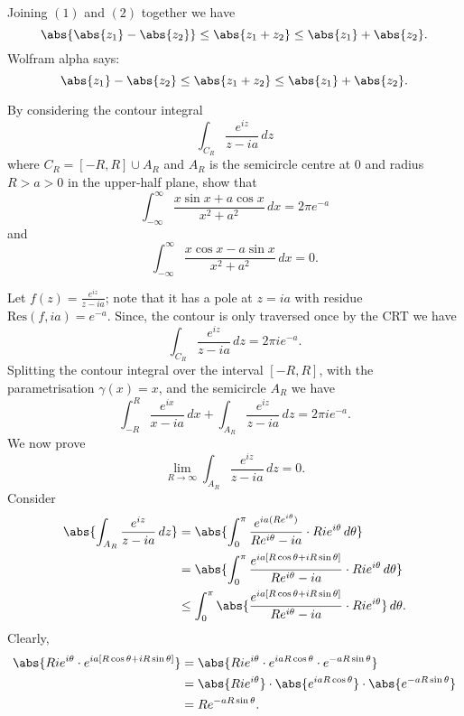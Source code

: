 \documentclass[12pt, a4paper]{article}
\begin{document}
\begin{mdremark}
    Joining \((1)\) and \((2)\) together we have 
    \[\abs{\abs{z_1}-\abs{z_2}} \leq \abs{z_1+z_2} \leq \abs{z_1}+\abs{z_2}.\]
    Wolfram alpha says:
    \[\abs{z_1}-\abs{z_2} \leq \abs{z_1+z_2} \leq \abs{z_1}+\abs{z_2}.\]
\end{mdremark}

\begin{example}
    By considering the contour integral 
    \[\int_{C_R} \frac{e^{iz}}{z-ia} \, dz\]
    where \(C_R=[-R,R] \cup A_R\) and \(A_R\) is the semicircle centre at \(0\) and radius \(R>a>0\) in the upper-half plane, show that 
    \[\int_{-\infty}^{\infty} \frac{x\sin x+a\cos x}{x^2+a^2} \, dx = 2\pi e^{-a}\]
    and
    \[\int_{-\infty}^{\infty} \frac{x\cos x-a\sin x}{x^2+a^2} \, dx=0.\]
    \begin{solution}
        Let \(f(z) = \frac{e^{iz}}{z-ia}\); note that it has a pole at \(z=ia\) with residue \(\text{Res}(f,ia)=e^{-a}\). Since, the contour is only traversed once by the CRT we have
        \[\int_{C_R} \frac{e^{iz}}{z-ia} \, dz = 2 \pi i e^{-a}.\]
        Splitting the contour integral over the interval \([-R,R]\), with the parametrisation \(\gamma(x) =x\), and the semicircle \(A_R\) we have 
        \[\int_{-R}^R \frac{e^{ix}}{x-ia} \, dx + \int_{A_R} \frac{e^{iz}}{z-ia} \, dz = 2\pi i e^{-a}.\]
        We now prove 
        \[\lim_{R\to \infty} \int_{A_R} \frac{e^{iz}}{z-ia} \, dz =0.\]
        Consider 
        \[\begin{aligned}
            \abs{\int_{A_R} \frac{e^{iz}}{z-ia} \, dz} &= \abs{\int_{0}^{\pi} \frac{e^{ia(Re^{i\theta})}}{Re^{i\theta}-ia} \cdot Rie^{i\theta} \, d\theta} \\
            &= \abs{\int_{0}^{\pi} \frac{e^{ia[R\cos\theta+iR\sin\theta]}}{Re^{i\theta}-ia} \cdot Rie^{i\theta} \, d\theta} \\
            &\leq \int_{0}^{\pi} \abs{\frac{e^{ia[R\cos\theta+iR\sin\theta]}}{Re^{i\theta}-ia} \cdot Rie^{i\theta}} \, d\theta.
        \end{aligned}\]
        Clearly, 
        \[\begin{aligned}
            \abs{Rie^{i\theta}  \cdot e^{ia[R\cos\theta+iR\sin\theta]}} &= \abs{Rie^{i\theta} \cdot e^{iaR\cos\theta} \cdot e^{-aR\sin\theta}} \\
            &= \abs{Rie^{i\theta}} \cdot \abs{e^{iaR\cos\theta}} \cdot \abs{e^{-aR\sin\theta}} \\
            &= Re^{-aR\sin\theta}.
        \end{aligned}\]

\end{solution}
\end{example}
\end{document}

